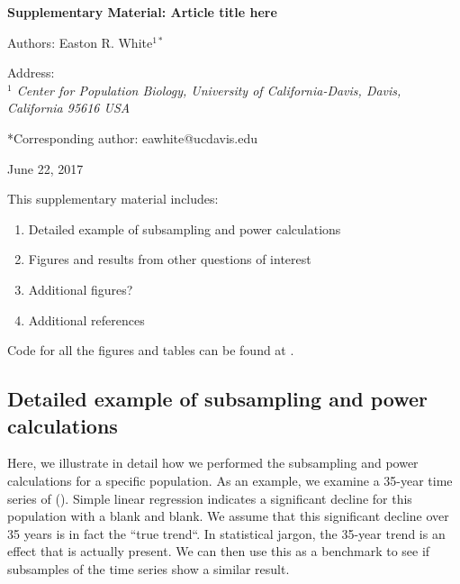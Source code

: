 \documentclass[12pt,]{article}
\title{}
\author{}
\date{}
\providecommand{\tightlist}{%
  \setlength{\itemsep}{0pt}\setlength{\parskip}{0pt}}
\begin{document}
\vspace{2cm}

\begin{center}
 \textbf{Supplementary Material: Article title here}
 
Authors: Easton R. White$^{1*}$
\vspace{3 mm}

Address: \\ \emph{$^1$ Center for Population Biology, University of California-Davis, Davis, California 95616 USA}

*Corresponding author: eawhite@ucdavis.edu

June 22, 2017
 \end{center}

\vspace{2cm}

This supplementary material includes:

\begin{enumerate}
\def\labelenumi{\arabic{enumi}.}
\tightlist
\item
  Detailed example of subsampling and power calculations
\item
  Figures and results from other questions of interest
\item
  Additional figures?
\item
  Additional references
\end{enumerate}

Code for all the figures and tables can be found at
\href{https://github.com/erwhite1}{}.

\vspace{2cm}

\subsection{Detailed example of subsampling and power
calculations}\label{detailed-example-of-subsampling-and-power-calculations}

Here, we illustrate in detail how we performed the subsampling and power
calculations for a specific population. As an example, we examine a
35-year time series of (). Simple linear regression indicates a
significant decline for this population with a blank and blank. We
assume that this significant decline over 35 years is in fact the ``true
trend``. In statistical jargon, the 35-year trend is an effect that is
actually present. We can then use this as a benchmark to see if
subsamples of the time series show a similar result.
\end{document}
